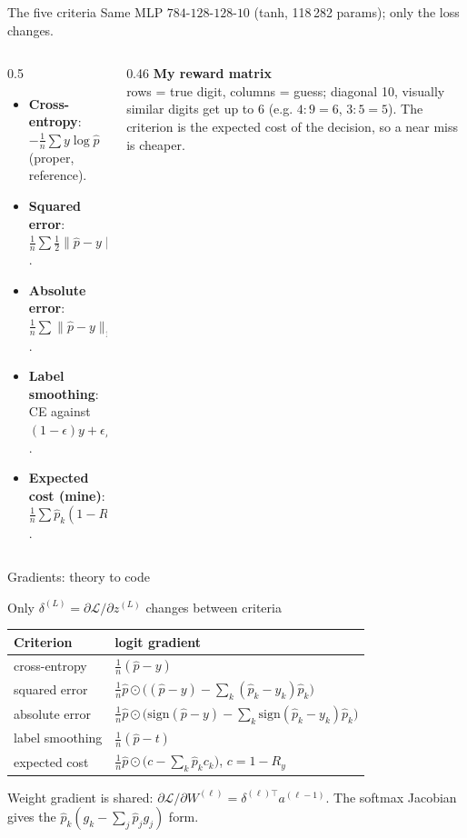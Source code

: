 \documentclass[aspectratio=169,11pt]{beamer}
\newcommand{\Lc}{\mathcal{L}}
\begin{document}
\begin{frame}{The five criteria}
  Same MLP $784\text{-}128\text{-}128\text{-}10$ (tanh, 118\,282 params); only the loss changes.
  \vspace{0.4em}
  \begin{columns}[T]
    \begin{column}{0.5\textwidth}
      \small
      \begin{itemize}
        \item \textbf{Cross-entropy}: $-\frac1n\sum y\log\hat p$ (proper, reference).
        \item \textbf{Squared error}: $\frac1n\sum\tfrac12\lVert\hat p-y\rVert^2$.
        \item \textbf{Absolute error}: $\frac1n\sum\lVert\hat p-y\rVert_1$.
        \item \textbf{Label smoothing}: CE against $(1-\epsilon)y+\epsilon/K$.
        \item \textbf{Expected cost (mine)}: $\frac1n\sum\hat p_k(1-R_{y,k})$.
      \end{itemize}
    \end{column}
    \begin{column}{0.46\textwidth}
      \textbf{My reward matrix}\\
      \small rows = true digit, columns = guess; diagonal 10, visually similar digits get up to
      6 (e.g. $4{:}9=6$, $3{:}5=5$). The criterion is the expected cost of the decision, so a
      near miss is cheaper.
    \end{column}
  \end{columns}
\end{frame}

\begin{frame}{Gradients: theory to code}
  \begin{block}{Only $\delta^{(L)}=\partial\Lc/\partial z^{(L)}$ changes between criteria}
  \small
  \begin{tabular}{@{}ll@{}}
  \toprule
  Criterion & logit gradient \\
  \midrule
  cross-entropy & $\frac1n(\hat p-y)$ \\
  squared error & $\frac1n\hat p\odot\big((\hat p-y)-\sum_k(\hat p_k-y_k)\hat p_k\big)$ \\
  absolute error & $\frac1n\hat p\odot\big(\mathrm{sign}(\hat p-y)-\sum_k\mathrm{sign}(\hat p_k-y_k)\hat p_k\big)$ \\
  label smoothing & $\frac1n(\hat p-t)$ \\
  expected cost & $\frac1n\hat p\odot\big(c-\sum_k\hat p_k c_k\big)$, $c=1-R_y$ \\
  \bottomrule
  \end{tabular}
  \end{block}
  \small
  Weight gradient is shared: $\partial\Lc/\partial W^{(\ell)}=\delta^{(\ell)\top}a^{(\ell-1)}$.
  The softmax Jacobian gives the $\hat p_k(g_k-\sum_j\hat p_j g_j)$ form.
\end{frame}
\end{document}

